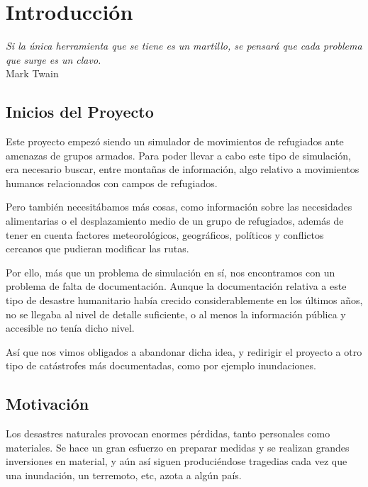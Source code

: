 \chapter{Introducción} \label{cap0a}

\begin{flushright}
\begin{minipage}{7.85cm}
    {\em Si la única herramienta que se tiene es un martillo, se pensará que
    cada problema que surge es un clavo.} \\  Mark Twain
\end{minipage}
\end{flushright}

\vspace*{5mm}

\section{Inicios del Proyecto}

Este proyecto empezó siendo un simulador de movimientos de refugiados ante
amenazas de grupos armados. Para poder llevar a cabo este tipo de simulación,
era necesario buscar, entre montañas de información, algo relativo a movimientos
humanos relacionados con campos de refugiados\cite{John08}.

Pero también necesitábamos más cosas, como información sobre las necesidades
alimentarias o el desplazamiento medio de un grupo de refugiados, además de
tener en cuenta factores meteorológicos, geográficos, políticos y conflictos
cercanos que pudieran modificar las rutas.

Por ello, más que un problema de simulación en sí, nos encontramos con un
problema de falta de documentación. Aunque la documentación relativa a este tipo
de desastre humanitario había crecido considerablemente en los últimos años,
no se llegaba al nivel de detalle suficiente, o al menos la información pública
y accesible no tenía dicho nivel.

Así que nos vimos obligados a abandonar dicha idea, y redirigir el proyecto a
otro tipo de catástrofes más documentadas, como por ejemplo inundaciones.

\section{Motivación}

Los desastres naturales provocan enormes pérdidas, tanto personales como
materiales. Se hace un gran esfuerzo en preparar medidas y se realizan grandes
inversiones en material, y aún así siguen produciéndose tragedias cada vez que
una inundación, un terremoto, etc, azota a algún país\cite{Cho07}.

